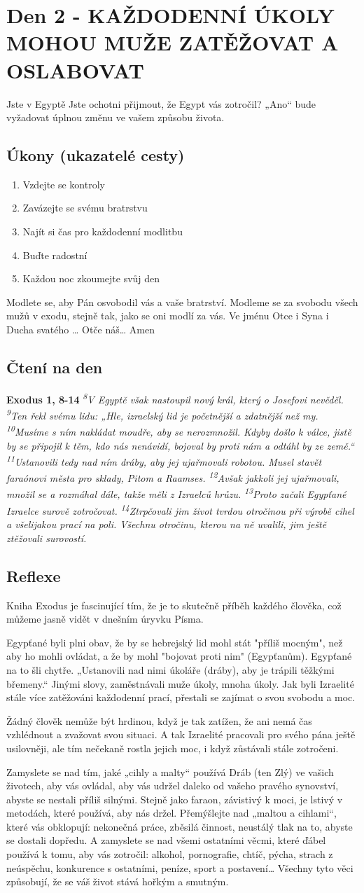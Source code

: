 \documentclass[11pt]{article}
\newcommand{\zacatekPrvniTyden}{
  Jste v Egyptě \newline
  Jste ochotni přijmout, že Egypt vás zotročil? „Ano“ bude vyžadovat úplnou změnu ve vašem způsobu života.

\subsection*{Úkony (ukazatelé cesty)}
\begin{enumerate}
  \item Vzdejte se kontroly
  \item Zavázejte se svému bratrstvu
  \item Najít si čas pro každodenní modlitbu
  \item Buďte radostní
  \item Každou noc zkoumejte svůj den
\end{enumerate}
Modlete se, aby Pán osvobodil vás a vaše bratrství. \newline
Modleme se za svobodu všech mužů v exodu, stejně tak, jako se oni modlí za vás.\newline
Ve jménu Otce i Syna i Ducha svatého …  Otče náš… Amen
}
\begin{document}
\newpage
\section{Den 2 - KAŽDODENNÍ ÚKOLY MOHOU MUŽE ZATĚŽOVAT A OSLABOVAT}
\zacatekPrvniTyden
\subsection*{Čtení na den}
\textbf{Exodus 1, 8-14}
\newline
\textit{
\textsuperscript{8}V Egyptě však nastoupil nový král, který o Josefovi nevěděl.
\textsuperscript{9}Ten řekl svému lidu: „Hle, izraelský lid je početnější a zdatnější než my.
\textsuperscript{10}Musíme s ním nakládat moudře, aby se nerozmnožil. Kdyby došlo k válce, jistě by se připojil k těm, kdo nás nenávidí, bojoval by proti nám a odtáhl by ze země.“
\textsuperscript{11}Ustanovili tedy nad ním dráby, aby jej ujařmovali robotou. Musel stavět faraónovi města pro sklady, Pitom a Raamses.
\textsuperscript{12}Avšak jakkoli jej ujařmovali, množil se a rozmáhal dále, takže měli z Izraelců hrůzu.
\textsuperscript{13}Proto začali Egypťané Izraelce surově zotročovat.
\textsuperscript{14}Ztrpčovali jim život tvrdou otročinou při výrobě cihel a všelijakou prací na poli. Všechnu otročinu, kterou na ně uvalili, jim ještě ztěžovali surovostí.  
}\subsection*{Reflexe}
Kniha Exodus je fascinující tím, že je to skutečně příběh každého člověka, což můžeme jasně vidět v dnešním úryvku Písma.

Egypťané byli plni obav, že by se hebrejský lid mohl stát "příliš mocným", než aby ho mohli ovládat, a že by mohl "bojovat proti nim" (Egypťanům). Egypťané na to šli chytře. „Ustanovili nad nimi úkoláře (dráby), aby je trápili těžkými břemeny.“ Jinými slovy, zaměstnávali muže úkoly, mnoha úkoly.
Jak byli Izraelité stále více zatěžováni každodenní prací, přestali se zajímat o svou svobodu a moc.

Žádný člověk nemůže být hrdinou, když je tak zatížen, že ani nemá čas vzhlédnout a zvažovat svou situaci. A tak Izraelité pracovali pro svého pána ještě usilovněji, ale tím nečekaně rostla jejich moc, i když zůstávali stále zotročeni.

Zamyslete se nad tím, jaké „cihly a malty“ používá Dráb (ten Zlý) ve vašich životech, aby vás ovládal, aby vás udržel daleko od vašeho pravého synovství, abyste se nestali příliš silnými. Stejně jako faraon, závistivý k moci, je lstivý v metodách, které používá, aby nás držel.
Přemýšlejte nad „maltou a cihlami“, které vás obklopují: nekonečná práce, zběsilá činnost, neustálý tlak na to, abyste se dostali dopředu. A zamyslete se nad všemi ostatními věcmi, které ďábel používá k tomu, aby vás zotročil: alkohol, pornografie, chtíč, pýcha, strach z neúspěchu, konkurence s ostatními, peníze, sport a postavení… Všechny tyto věci způsobují, že se váš život stává hořkým a smutným.
\end{document}
